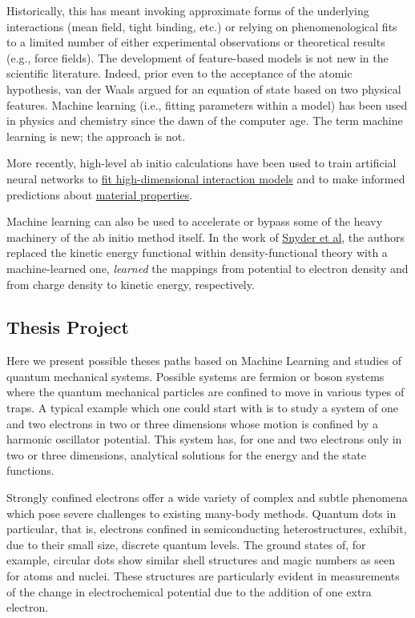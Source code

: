 \documentclass[%
oneside,                 %
final,                   %
10pt]{article}
\begin{document}
Historically, this has meant invoking
approximate forms of the underlying interactions (mean field, tight
binding, etc.) or relying on phenomenological fits to a limited number
of either experimental observations or theoretical results (e.g., force fields). 
The development of feature-based models is not
new in the scientific literature. Indeed, prior even to the acceptance
of the atomic hypothesis, van der Waals argued for an equation of
state based on two physical features. Machine learning (i.e.,
fitting parameters within a model) has been used in physics and
chemistry since the dawn of the computer age. The term machine
learning is new; the approach is not.

More recently, high-level ab initio calculations have been used to
train artificial neural networks to \href{{http://www.sciencedirect.com/science/article/pii/S0927025615007806?via%
models}  and to make informed predictions about \href{{https://www.nature.com/articles/srep40827}}{material properties}. 

Machine learning can also be used to accelerate or bypass some of the
heavy machinery of the ab initio method itself. In the work of \href{{https://journals.aps.org/prl/abstract/10.1103/PhysRevLett.108.253002}}{Snyder et al},  the authors
replaced the kinetic energy functional within density-functional
theory with a machine-learned one, 
\emph{learned} the mappings from potential to electron density and from
charge density to kinetic energy, respectively.

\subsection*{Thesis Project}

Here we present possible theses paths based on Machine Learning and
studies of quantum mechanical systems.  Possible systems are fermion
or boson systems where the quantum mechanical particles are confined
to move in various types of traps. A typical example which one could
start with is to study a system of one and two electrons in two or three
dimensions whose motion is confined by a harmonic  oscillator potential. This
system has, for one and two electrons only in two or three dimensions,
analytical solutions for the energy and the state
functions. 

Strongly confined electrons offer a wide variety of complex and subtle
phenomena which pose severe challenges to existing many-body methods.
Quantum dots in particular, that is, electrons confined in
semiconducting heterostructures, exhibit, due to their small size,
discrete quantum levels.  The ground states of, for example, circular
dots show similar shell structures and magic numbers as seen for atoms
and nuclei. These structures are particularly evident in measurements
of the change in electrochemical potential due to the addition of one
extra electron.
\end{document}
